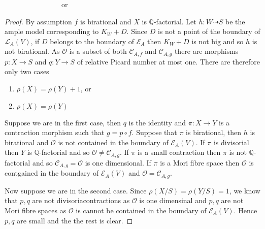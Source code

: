 \documentclass{article}
\begin{document}
$\qquad\qquad\qquad\qquad$or$\qquad\qquad\qquad\qquad$
\begin{proof}
 By assumption $f$  is birational and $X$  is $\mathbb{Q}$-factorial. Let $h: W \dashrightarrow S$ be the ample model corresponding to  $K_{W}+D$. Since $D$  is not a point of the boundary of $\mathcal{L}_{A}(V)$,  if $D$ belongs to the boundary of $\mathcal{E}_{A}$ then $K_{W}+D$ is not big and so $h$  is not birational. As $\mathcal{O}$   is a subset of both $\mathcal{C}_{A,f}$ and $\mathcal{C}_{A,g}$ there are morphisms $p: X\to S $ and  $q:Y\to S$ 
of relative Picard number at most one. There are therefore only two cases
\begin{enumerate}
  \item $\rho (X)=\rho(Y)+1$, or 
  \item $\rho(X)=\rho(Y)$
\end{enumerate}
Suppose we are in the first case, then $q$ is the identity and $\pi:X\to Y$  is a contraction morphism such that $
g=p \circ f$. Suppose that $\pi$ is birational, then $ h $ is birational and $\mathcal{O}$ is not contained in the boundary of  $\mathcal{E}_{A}(V)$. If $\pi$ is divisorial then $Y$ is $\mathbb{Q}$-factorial and so $\mathcal{O} \neq \mathcal{C}_{A,g}$. If $\pi $ is a small contraction then $\pi $ is not $\mathbb{Q}$-factorial and so $\mathcal{C}_{A,g}=\mathcal{O}$ is one dimensional. If $\pi $ is a Mori fibre space then $\mathcal{O} $ is contgained in the boundary of $\mathcal{E}_{A}(V)$ and $\mathcal{O} = \mathcal{C}_{A,g}$.

Now suppose we are in the second case. Since $\rho(X/S)=\rho(Y/S)=1$, we know that $p,q$ are not divisoriacontractions as $\mathcal{O}$ is one dimensinal and $p,q $ are not Mori fibre spaces as $\mathcal{O} $ is cannot be contained in the boundary of $\mathcal{E}_{A}(V)$. Hence  $p,q$ are small and the the rest is clear.
\end{proof}
\end{document}
